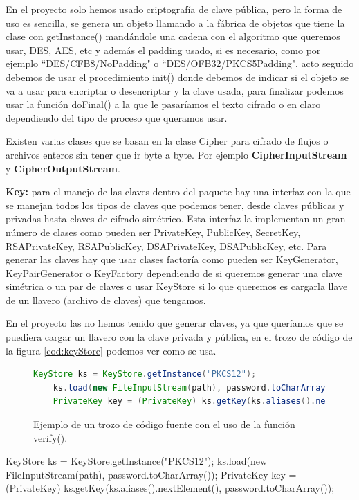 En el proyecto solo hemos usado criptografía de clave pública, pero la forma de uso es sencilla, se genera un objeto llamando a la fábrica de objetos que tiene la clase con getInstance() mandándole una cadena con el algoritmo que queremos usar, DES, AES, etc y además el padding usado, si es necesario, como por ejemplo ``DES/CFB8/NoPadding" o ``DES/OFB32/PKCS5Padding", acto seguido debemos de usar el procedimiento init() donde debemos de indicar si el objeto se va a usar para encriptar o desencriptar y la clave usada, para finalizar podemos usar la función doFinal() a la que le pasaríamos el texto cifrado o en claro dependiendo del tipo de proceso que queramos usar.

Existen varias clases que se basan en la clase Cipher para cifrado de flujos o archivos enteros sin tener que ir byte a byte. Por ejemplo \textbf{CipherInputStream} y \textbf{CipherOutputStream}. 

\textbf{Key:} para el manejo de las claves dentro del paquete hay una interfaz con la que se manejan todos los tipos de claves que podemos tener, desde claves públicas y privadas hasta claves de cifrado simétrico. Esta interfaz la implementan un gran número de clases como pueden ser     PrivateKey, PublicKey, SecretKey, RSAPrivateKey, RSAPublicKey, DSAPrivateKey, DSAPublicKey, etc. Para generar las claves hay que usar clases factoría como pueden ser KeyGenerator, KeyPairGenerator o KeyFactory dependiendo de si queremos generar una clave simétrica o un par de claves o usar KeyStore si lo que queremos es cargarla llave de un llavero (archivo de claves) que tengamos.

En el proyecto las no hemos tenido que generar claves, ya que queríamos que se puediera cargar un llavero con la clave privada y pública, en el trozo de código de la figura \ref{cod:keyStore} podemos ver como se usa.

\begin{figure}

	\begin{scriptsize}
	\begin{lstlisting}[language=Java] 
	KeyStore ks = KeyStore.getInstance("PKCS12");
	ks.load(new FileInputStream(path), password.toCharArray());
	PrivateKey key = (PrivateKey) ks.getKey(ks.aliases().nextElement(), password.toCharArray());
	\end{lstlisting}
	\end{scriptsize}
		\caption{Ejemplo de un trozo de código fuente con el uso de la función verify().}
		\label{cod:verify}
\end{figure}


KeyStore ks = KeyStore.getInstance("PKCS12");
ks.load(new FileInputStream(path), password.toCharArray());
PrivateKey key = (PrivateKey) ks.getKey(ks.aliases().nextElement(), password.toCharArray());











 
